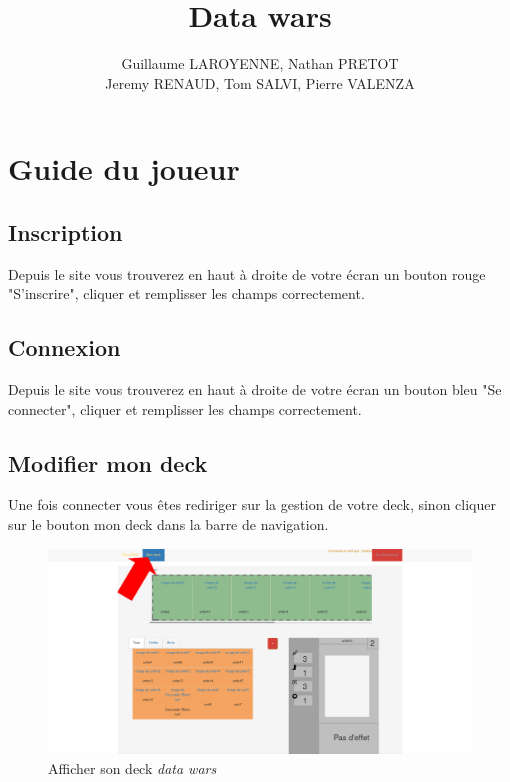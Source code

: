 \documentclass[a4paper,11pt]{report}
\title{Data wars }
\author{Guillaume LAROYENNE, Nathan PRETOT \\ Jeremy RENAUD, Tom SALVI, Pierre VALENZA}
\begin{document}
\maketitle
\tableofcontents

\chapter{Guide du joueur}

	\section{Inscription}
        Depuis le site vous trouverez en haut à droite de votre écran un bouton rouge "S'inscrire", cliquer et remplisser les champs correctement. 

	\section{Connexion}
        Depuis le site vous trouverez en haut à droite de votre écran un bouton bleu "Se connecter", cliquer et remplisser les champs correctement. 

	\section{Modifier mon deck}
       	Une fois connecter vous êtes rediriger sur la gestion de votre deck, sinon cliquer sur le bouton mon deck dans la barre de navigation. 

	\begin{figure}[th]
		\begin{center}
		\includegraphics[scale=0.4]{Assets/go_deck.png}
      		\caption{Afficher son deck \textit{data wars}}
      		\label{fig1}
     		\end{center}
	\end{figure}
\end{document}
